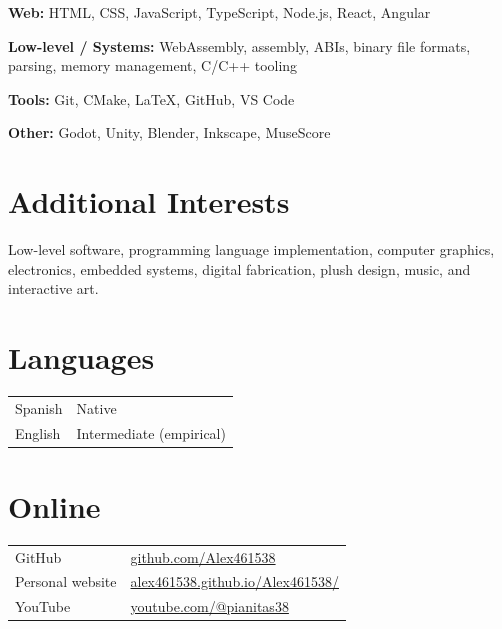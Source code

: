 \documentclass[10pt,a4paper]{article}
\begin{document}
	\textbf{Web:}
	HTML, CSS, JavaScript, TypeScript, Node.js, React, Angular
	
	\textbf{Low-level / Systems:}
	WebAssembly, assembly, ABIs, binary file formats,
	parsing, memory management, C/C++ tooling
	
	\textbf{Tools:}
	Git, CMake, LaTeX, GitHub, VS Code
	
	\textbf{Other:}
	Godot, Unity, Blender, Inkscape, MuseScore
	
	
	\section{Additional Interests}
	
	Low-level software, programming language implementation,
	computer graphics, electronics, embedded systems,
	digital fabrication, plush design, music, and interactive art.
	
	
	\section{Languages}
	
	\begin{tabularx}{\textwidth}{@{}lX@{}}
		Spanish & Native \\
		English & Intermediate (empirical) \\
	\end{tabularx}
	
	
	\section{Online}
	
	\begin{tabularx}{\textwidth}{@{}lX@{}}
		GitHub &
		\href{https://github.com/Alex461538}
		{github.com/Alex461538}
		\\
		
		Personal website &
		\href{https://alex461538.github.io/Alex461538/}
		{alex461538.github.io/Alex461538/}
		\\
		
		YouTube &
		\href{https://youtube.com/@pianitas38}
		{youtube.com/@pianitas38}
	\end{tabularx}
	
\end{document}
